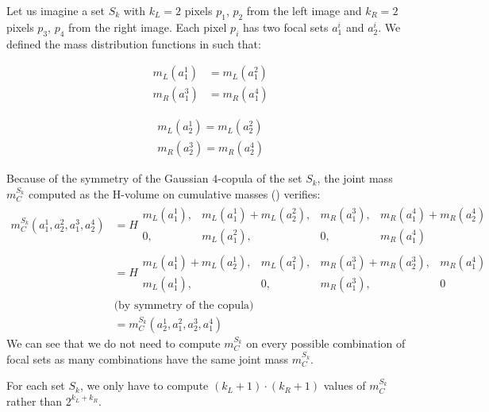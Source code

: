 \begin{example}
    Let us imagine a set $S_k$ with $k_L=2$ pixels $p_1$, $p_2$ from the left image and $k_R=2$ pixels $p_3$, $p_4$ from the right image. Each pixel $p_i$ has two focal sets $a^i_1$ and $a^i_2$.
    We defined the mass distribution functions in  such that:
    \newline\medskip
    \begin{minipage}{0.5\linewidth}
    	\begin{align*}
    		&m_L(a_1^1) &= m_L(a_1^2) \\
    		&m_R(a_1^3) &= m_R(a_1^4)
    	\end{align*}
    \end{minipage}
    \begin{minipage}{0.5\linewidth}
    	\begin{align*}
    		&m_L(a_2^1) = m_L(a_2^2)\\
    		&m_R(a_2^3) = m_R(a_2^4)
    	\end{align*}
    \end{minipage}\bigskip\newline
    Because of the symmetry of the Gaussian $4$-copula of the set $S_k$, the joint mass $m^{S_k}_C$ computed as the H-volume on cumulative masses () verifies:
    \begin{align*}
        m^{S_k}_C(a_1^1, a_2^2, a_1^3, a_2^4) &= H
        \begin{matrix}
            m_L(a_1^1), & m_L(a_1^1)+m_L(a_2^2), & m_R(a_1^3), & m_R(a_1^4)+m_R(a_2^4)\\
            0, & m_L(a^2_1), & 0, & m_R(a_1^4)
        \end{matrix}\\
        &=H
        \begin{matrix}
            m_L(a_1^1)+m_L(a_2^1), & m_L(a_1^2), & m_R(a_1^3)+m_R(a_2^3), & m_R(a_1^4)\\
            m_L(a^1_1), & 0, & m_R(a_1^3), & 0
        \end{matrix}\\
        &\text{(by symmetry of the copula)}\\
        &= m^{S_k}_C(a_2^1, a_1^2, a_2^3, a_1^4)
    \end{align*}
    We can see that we do not need to compute $m^{S_k}_C$ on every possible combination of focal sets as many combinations have the same joint mass $m^{S_k}_C$.
\end{example}
For each set $S_k$, we only have to compute $(k_L+1)\cdot(k_R+1)$ values of $m^{S_k}_C$ rather than $2^{k_L+k_R}$.

